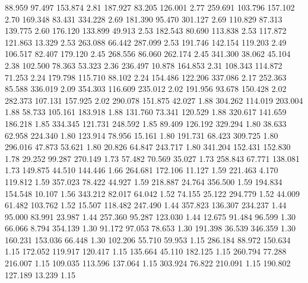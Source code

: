   88.959   97.497  153.874         2.81
 187.927   83.205  126.001         2.77
 259.691  103.796  157.102         2.70
 169.348   83.431  334.228         2.69
 181.390   95.470  301.127         2.69
 110.829   87.313  139.775         2.60
 176.120  133.899   49.913         2.53
 182.543   80.690  113.838         2.53
 117.872  121.863   13.329         2.53
 263.088   66.442  287.099         2.53
 191.746  142.154  119.203         2.49
 106.517   82.407  179.120         2.45
 268.556   86.060  262.174         2.45
 341.300   38.062   45.104         2.38
 102.500   78.363   53.323         2.36
 236.497   10.878  164.853         2.31
 108.343  114.872   71.253         2.24
 179.798  115.710   88.102         2.24
 154.486  122.206  337.086         2.17
 252.363   85.588  336.019         2.09
 354.303  116.609  235.012         2.02
 191.956   93.678  150.428         2.02
 282.373  107.131  157.925         2.02
 290.078  151.875   42.027         1.88
 304.262  114.019  203.004         1.88
  58.733  105.161  183.918         1.88
 131.760   73.341  120.529         1.88
 320.617  141.659  186.218         1.85
 334.345  121.731  248.592         1.85
  89.409  126.192  329.294         1.80
  38.633   62.958  224.340         1.80
 123.914   78.956   15.161         1.80
 191.731   68.423  309.725         1.80
 296.016   47.873   53.621         1.80
  20.826   64.847  243.717         1.80
 341.204  152.431  152.830         1.78
  29.252   99.287  270.149         1.73
  57.482   70.569   35.027         1.73
 258.843   67.771  138.081         1.73
 149.875   44.510  144.446         1.66
 264.681  172.106   11.127         1.59
 221.463    4.170  119.812         1.59
 357.023   78.422   44.927         1.59
 218.887   24.764  356.500         1.59
 194.834  154.548   10.107         1.56
 343.212   82.017   64.042         1.52
  74.155   25.122  294.779         1.52
  44.009   61.482  103.762         1.52
  15.507  118.482  247.490         1.44
 357.823  136.307  234.237         1.44
  95.000   83.991   23.987         1.44
 257.360   95.287  123.030         1.44
  12.675   91.484   96.599         1.30
  66.066    8.794  354.139         1.30
  91.172   97.053   78.653         1.30
 191.398   36.539  346.359         1.30
 160.231  153.036   66.448         1.30
 102.206   55.710   59.953         1.15
 286.184   88.972  150.634         1.15
 172.052  119.917  120.417         1.15
 135.664   45.110  182.125         1.15
 260.794   77.288  216.007         1.15
 109.035  113.596  137.064         1.15
 303.924   76.822  210.091         1.15
 190.802  127.189   13.239         1.15
